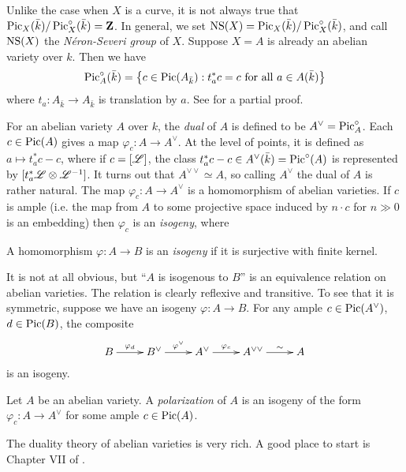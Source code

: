 Unlike the case when $X$ is a curve, it is not always true that 
$\operatorname{Pic}_X(\bar k)/\operatorname{Pic}_X^\circ(\bar k) = \mathbf{Z}$. In general, we set 
$\operatorname{NS}(X) = \operatorname{Pic}_X(\bar k) / \operatorname{Pic}_X^\circ(\bar k)$, and call 
$\operatorname{NS}(X)$ the \emph{N\'eron-Severi group} of $X$. 
Suppose $X=A$ is already an abelian variety over $k$. Then we have 
\[
  \operatorname{Pic}_A^\circ(\bar k) = \left\{c\in \operatorname{Pic}(A_{\bar k}) : t_a^* c = c\text{ for all }a\in A(\bar k)\right\} 
\]
where $t_a:A_{\bar k}\to A_{\bar k}$ is translation by $a$. See 
\cite[I.8.4]{mi-av} for a partial proof. 

For an abelian variety $A$ over $k$, 
the \emph{dual} of $A$ is defined to be $A^\vee = \operatorname{Pic}_A^\circ$. 
Each $c\in \operatorname{Pic}(A)$ gives a map $\varphi_c:A\to A^\vee$. At the level of 
points, it is defined as $a\mapsto t_a^* c - c$, where if $c=[\mathscr{L}]$, 
the class $t_a^*c - c\in A^\vee(\bar k) = \operatorname{Pic}^\circ(A)$ is represented by 
$[t_a^*\mathscr{L}\otimes\mathscr{L}^{-1}]$. 
It turns out that $A^{\vee\vee} \simeq A$, so calling $A^\vee$ the dual of $A$ 
is rather natural. The map $\varphi_c:A\to A^\vee$ is a homomorphism of abelian 
varieties. If $c$ is ample (i.e. the map from $A$ to some projective space 
induced by $n\cdot c$ for $n\gg 0$ is an embedding) then $\varphi_c$ is an 
\emph{isogeny}, where 

\begin{definition}
A homomorphism $\varphi:A\to B$ is an \emph{isogeny} if it is surjective with 
finite kernel.
\end{definition}

It is not at all obvious, but ``$A$ is isogenous to $B$'' is an equivalence 
relation on abelian varieties. The relation is clearly reflexive and 
transitive. To see that it is symmetric, suppose we have an 
isogeny $\varphi:A\to B$. For any ample $c\in \operatorname{Pic}(A^\vee)$, $d\in \operatorname{Pic}(B)$, 
the composite 
\[\xymatrix{
  B \ar[r]^-{\varphi_d} 
    & B^\vee \ar[r]^-{\varphi^\vee} 
    & A^\vee \ar[r]^-{\varphi_c}
    & A^{\vee\vee} \ar[r]^-\sim 
    & A
}\]
is an isogeny. 

\begin{definition}
Let $A$ be an abelian variety. A \emph{polarization} of $A$ is an isogeny 
of the form $\varphi_c:A\to A^\vee$ for some ample $c\in \operatorname{Pic}(A)$.
\end{definition}

The duality theory of abelian varieties is very rich. A good place to start 
is Chapter VII of \cite{gm13}. 





